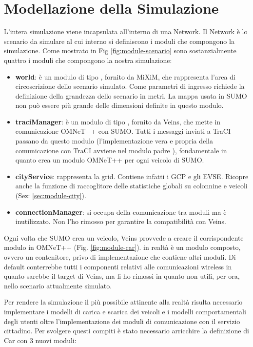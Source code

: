 \section{Modellazione della Simulazione}

L'intera simulazione viene incapsulata all'interno di una Network. Il Network è lo scenario da simulare al cui interno si definiscono i moduli che compongono la simulazione. Come mostrato in Fig \ref{fig:module-scenario} sono sostanzialmente quattro i moduli che compongono la nostra simulazione:

\begin{itemize}
	\item \textbf{world}: è un modulo di tipo , fornito da MiXiM, che rappresenta l'area di circoscrizione dello scenario simulato. Come parametri di ingresso richiede la definizione della grandezza dello scenario in metri. La mappa usata in SUMO non può essere più grande delle dimensioni definite in questo modulo.
	\item \textbf{traciManager}: è un modulo di tipo , fornito da Veins, che mette in comunicazione OMNeT++ con SUMO. Tutti i messaggi inviati a TraCI passano da questo modulo (l'implementazione vera e propria della comunicazione con TraCI avviene nel modulo padre ), fondamentale in quanto crea un modulo OMNeT++ per ogni veicolo di SUMO.
	\item \textbf{cityService}: rappresenta la grid. Contiene infatti i GCP e gli EVSE. Ricopre anche la funzione di raccoglitore delle statistiche globali su colonnine e veicoli (Sez: \ref{sec:module-city}).
	\item \textbf{connectionManager}: si occupa della comunicazione tra moduli ma è inutilizzato. Non l'ho rimosso per garantire la compatibilità con Veins.
\end{itemize}

Ogni volta che SUMO crea un veicolo, Veins provvede a creare il corrispondente modulo  in OMNeT++ (Fig. \ref{fig:module-car}).   in realtà è un modulo composto, ovvero un contenitore, privo di implementazione che contiene altri moduli. Di default conterrebbe tutti i componenti relativi alle comunicazioni wireless in quanto sarebbe il target di Veins, ma li ho rimossi in quanto non utili, per ora, nello scenario attualmente simulato.

Per rendere la simulazione il più possibile attinente alla realtà risulta necessario implementare i modelli di carica e scarica dei veicoli e i modelli comportamentali degli utenti oltre l'implementazione dei moduli di comunicazione con il servizio cittadino. Per svolgere questi compiti è stato necessario arricchire la definizione di Car con 3 nuovi moduli:

